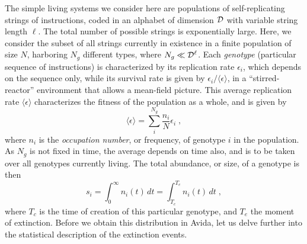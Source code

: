 \documentclass[letterpaper]{article}
\begin{document}
The simple living systems we consider here are populations of
self-replicating strings of instructions, coded in an alphabet of
dimension ${\cal D}$ with variable string length $\ell$. The total
number of possible strings is exponentially large. Here, we consider
the subset of all strings currently in existence in a finite
population of size $N$, harboring $N_g$ different types, where
$N_g\ll{\cal D}^\ell$. Each {\em genotype} (particular sequence of
instructions) is characterized by its replication rate $\epsilon_i$,
which depends on the sequence only, while its survival rate is given
by $\epsilon_i/\langle \epsilon\rangle$, in a ``stirred-reactor''
environment that allows a mean-field picture. This average replication
rate $\langle \epsilon\rangle$ characterizes the fitness of the
population as a whole, and is given by
\begin{equation}
    \langle \epsilon\rangle=\sum_i^{N_g}\frac{n_i}N \epsilon_i\;,
\end{equation}
where $n_i$ is the {\em occupation number}, or frequency, of genotype
$i$ in the population. As $N_g$ is not fixed in time, the average
depends on time also, and is to be taken over all genotypes currently
living. The total abundance, or size, of a genotype is then
\begin{equation}
    s_i=\int_0^\infty n_i(t)\, dt=\int_{T_c}^{T_e}n_i(t)\, dt\;,
    \label{size}
\end{equation}
where $T_c$ is the time of creation of this particular genotype, and
$T_e$ the moment of extinction. Before we obtain this distribution in
Avida, let us delve further into the statistical description of the
extinction events.
\end{document}
